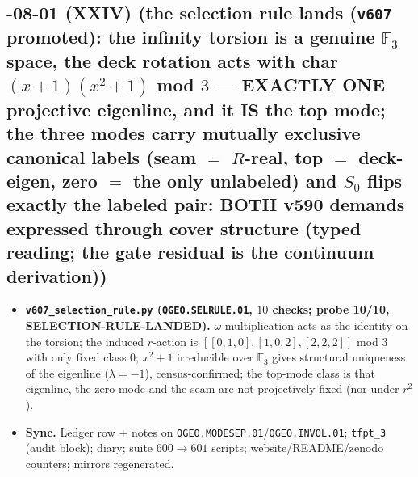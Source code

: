 \documentclass[11pt]{article}
\begin{document}
\subsection*{-08-01 (XXIV) (the selection rule lands (\texttt{v607} promoted): the infinity torsion is a genuine $\mathbb{F}_3$ space, the deck rotation acts with char $(x+1)(x^2+1)$ mod $3$ --- EXACTLY ONE projective eigenline, and it IS the top mode; the three modes carry mutually exclusive canonical labels (seam $=$ $R$-real, top $=$ deck-eigen, zero $=$ the only unlabeled) and $S_0$ flips exactly the labeled pair: BOTH v590 demands expressed through cover structure (typed reading; the gate residual is the continuum derivation))}
\begin{itemize}[leftmargin=1.5em]
\item \textbf{\texttt{v607\_selection\_rule.py} (\texttt{QGEO.SELRULE.01}, $10$ checks; probe
10/10, SELECTION-RULE-LANDED).} $\omega$-multiplication acts as the identity on the torsion;
the induced $r$-action is $[[0,1,0],[1,0,2],[2,2,2]]$ mod $3$ with only fixed class $0$;
$x^2+1$ irreducible over $\mathbb{F}_3$ gives structural uniqueness of the eigenline
($\lambda=-1$), census-confirmed; the top-mode class is that eigenline, the zero mode and
the seam are not projectively fixed (nor under $r^2$).
\item \textbf{Sync.} Ledger row + notes on
\texttt{QGEO.MODESEP.01}/\texttt{QGEO.INVOL.01}; \texttt{tfpt\_3} (audit block); diary;
suite $600\to601$ scripts; website/README/zenodo counters; mirrors regenerated.
\end{itemize}
\end{document}
